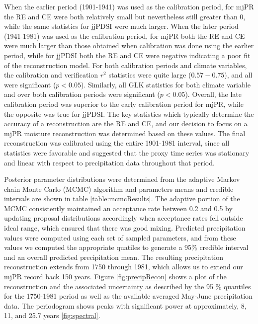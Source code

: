 \documentclass[11pt]{article}
\begin{document}
When the earlier period (1901-1941) was used as the calibration period, for mjPR the RE and CE were both relatively small but nevertheless still greater than 0, while the same statistics for jjPDSI were much larger. When the later period (1941-1981) was used as the calibration period, for mjPR both the RE and CE were much larger than those obtained when calibration was done using the earlier period, while for jjPDSI both the RE and CE were negative indicating a poor fit of the reconstruction model. For both calibration periods and climate variables, the calibration and verification $r^2$ statistics were quite large ($0.57 - 0.75$), and all were significant ($p<0.05$). Similarly, all GLK statistics for both climate variable and over both calibration periods were significant ($p<0.05$). Overall, the late calibration period was superior to the early calibration period for mjPR, while the opposite was true for jjPDSI. The key statistics which typically determine the accuracy of a reconstruction are the RE and CE, and our decision to focus on a mjPR moisture reconstruction was determined based on these values. The final reconstruction was calibrated using the entire 1901-1981 interval, since all statistics were favorable and suggested that the proxy time series was stationary and linear with respect to precipitation data throughout that period. 

Posterior parameter distributions were determined from the adaptive Markov chain Monte Carlo (MCMC) algorithm and parameters means and credible intervals are shown in table \ref{table:mcmcResults}. The adaptive portion of the MCMC consistently maintained an acceptance rate between 0.2 and 0.5 by updating proposal distributions accordingly when acceptance rates fell outside ideal range, which ensured that there was good mixing. Predicted precipitation values were computed using each set of sampled parameters, and from these values we computed the appropriate quatiles to generate a 95\% credible interval and an overall predicted precipitation mean. The resulting precipitation reconstruction extends from 1750 through 1981, which allows us to extend our mjPR record back 150 years. Figure \ref{fig:precipRecon} shows a plot of the reconstruction and the associated uncertainty as described by the 95 \% quantiles for the 1750-1981 period as well as the available averaged May-June precipitation data. The periodogram shows peaks with significant power at approximately, 8, 11, and 25.7 years \ref{fig:spectral}.
\end{document}
